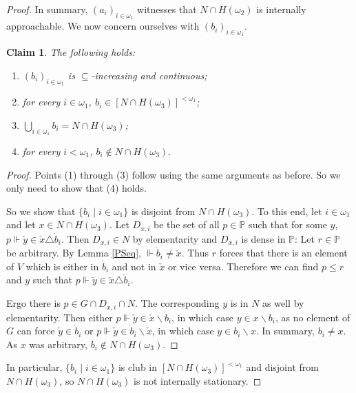 \documentclass[a4paper]{amsart}
\theoremstyle{definition}
\theoremstyle{remark}
\theoremstyle{plain}
\newtheorem*{myclaim}{Claim}
\numberwithin{mydef}{section}
\newcommand{\dP}{\mathbb{P}}
\begin{document}
\begin{proof}
		In summary, $(a_i)_{i\in\omega_1}$ witnesses that $N\cap H(\omega_2)$ is internally approachable. We now concern ourselves with $(b_i)_{i\in\omega_1}$.
		
		\begin{myclaim}
			The following holds:
			\begin{enumerate}
				\item $(b_i)_{i\in\omega_1}$ is $\subseteq$-increasing and continuous;
				\item for every $i\in\omega_1$, $b_i\in[N\cap H(\omega_3)]^{<\omega_1}$;
				\item $\bigcup_{i\in\omega_1}b_i=N\cap H(\omega_3)$;
				\item for every $i<\omega_1$, $b_i\notin N\cap H(\omega_3)$.
			\end{enumerate}
		\end{myclaim}
		
		\begin{proof}
			Points (1) through (3) follow using the same arguments as before. So we only need to show that (4) holds.
			
			So we show that $\{b_i\;|\;i\in\omega_1\}$ is disjoint from $N\cap H(\omega_3)$. To this end, let $i\in\omega_1$ and let $x\in N\cap H(\omega_3)$. Let $D_{x,i}$ be the set of all $p\in\dP$ such that for some $y$, $p\Vdash \check{y}\in\check{x}\triangle\dot{b}_i$. Then $D_{x,i}\in N$ by elementarity and $D_{x,i}$ is dense in $\dP$: Let $r\in\dP$ be arbitrary. By Lemma \ref{PSeq}, $\Vdash\dot{b}_i\neq\check{x}$. Thus $r$ forces that there is an element of $V$ which is either in $\dot{b}_i$ and not in $\check{x}$ or vice versa. Therefore we can find $p\leq r$ and $y$ such that $p\Vdash\check{y}\in\check{x}\triangle\dot{b}_i$.
			
			Ergo there is $p\in G\cap D_{x,i}\cap N$. The corresponding $y$ is in $N$ as well by elementarity. Then either $p\Vdash\check{y}\in\check{x}\smallsetminus\dot{b}_i$, in which case $y\in x\smallsetminus b_i$, as no element of $G$ can force $\check{y}\in\dot{b}_i$ or $p\Vdash\check{y}\in\dot{b}_i\smallsetminus\check{x}$, in which case $y\in b_i\smallsetminus x$. In summary, $b_i\neq x$. As $x$ was arbitrary, $b_i\notin N\cap H(\omega_3)$.
		\end{proof}
		
		In particular, $\{b_i\;|\;i\in\omega_1\}$ is club in $[N\cap H(\omega_3)]^{<\omega_1}$ and disjoint from $N\cap H(\omega_3)$, so $N\cap H(\omega_3)$ is not internally stationary.
	\end{proof}
	
\end{document}

